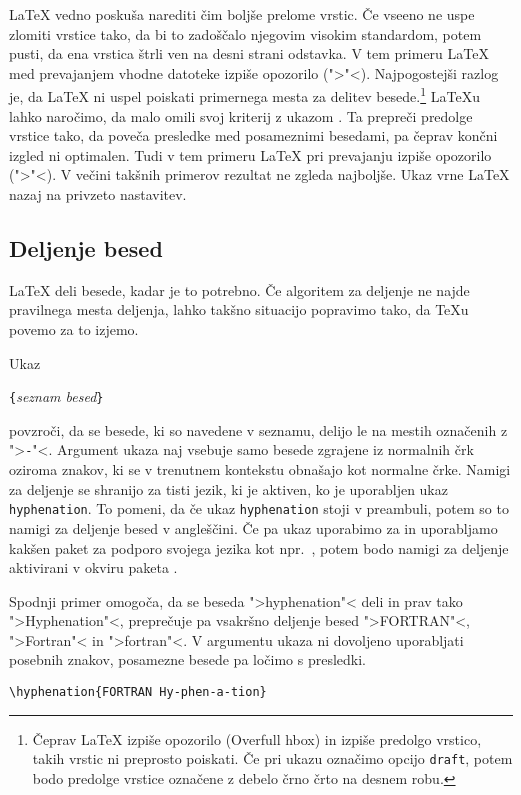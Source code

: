 \LaTeX{} vedno poskuša narediti čim boljše prelome vrstic. Če vseeno
ne uspe zlomiti vrstice tako, da bi to zadoščalo njegovim visokim standardom,
potem pusti, da ena vrstica štrli ven na desni strani odstavka.
V tem primeru \LaTeX{} med prevajanjem vhodne datoteke izpiše opozorilo 
(">"<). Najpogostejši razlog je, da \LaTeX{} ni
 uspel poiskati primernega mesta za 
delitev besede.\footnote{Čeprav \LaTeX{} izpiše opozorilo
   (Overfull hbox) in izpiše predolgo vrstico, takih vrstic ni preprosto poiskati. 
   Če pri ukazu  označimo opcijo \texttt{draft}, potem bodo predolge
   vrstice označene z debelo črno črto na desnem robu.}
\LaTeX{}u lahko naročimo, da malo omili svoj kriterij z ukazom . 
Ta prepreči predolge vrstice tako, da poveča presledke med posameznimi besedami, pa čeprav končni izgled
ni optimalen. Tudi v tem primeru \LaTeX{} pri prevajanju izpiše opozorilo (">"<). 
V večini takšnih primerov rezultat ne zgleda najboljše. Ukaz  vrne \LaTeX{} nazaj na privzeto nastavitev.

\subsection{Deljenje besed} \label{hyph}

\LaTeX{} deli besede, kadar je to potrebno. Če algoritem za deljenje ne najde pravilnega mesta deljenja,
lahko takšno situacijo popravimo tako, da \TeX{}u povemo za to izjemo.

Ukaz
\begin{lscommand}
\verb|{|\emph{seznam besed}\verb|}|
\end{lscommand}
\noindent povzroči, da se besede, ki so navedene v seznamu, delijo le na mestih označenih
z ">\verb|-|"<.  Argument ukaza naj vsebuje samo besede zgrajene iz normalnih črk oziroma znakov, ki se
v trenutnem kontekstu obnašajo kot normalne črke. Namigi za deljenje se shranijo za tisti jezik, ki je aktiven,
ko je uporabljen ukaz \texttt{hyphenation}. To pomeni, da če ukaz \texttt{hyphenation} stoji v preambuli, potem 
so to namigi za deljenje besed v angleščini. Če pa ukaz uporabimo 
za \verb|| in uporabljamo kakšen paket za podporo svojega jezika kot npr.~, potem 
bodo namigi za deljenje aktivirani v okviru paketa .

Spodnji primer omogoča, da se beseda ">hyphenation"< deli in prav tako 
">Hyphenation"<, preprečuje pa vsakršno deljenje besed ">FORTRAN"<, ">Fortran"< in ">fortran"<. 
V argumentu ukaza ni dovoljeno uporabljati posebnih znakov, posamezne besede pa ločimo
s presledki.
\begin{code}
\verb|\hyphenation{FORTRAN Hy-phen-a-tion}|
\end{code}

